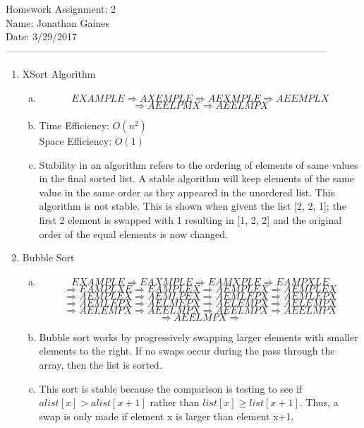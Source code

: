 \documentclass[12pt]{article}
\begin{document}
Homework Assignment: 2\\ 
Name: Jonathan Gaines\\ 
Date: 3/29/2017\\ --------------------------------------------------------------------------------------------------
\begin {enumerate}
\item XSort Algorithm
	\begin {enumerate}[(a)]
		\item
		$$EXAMPLE\Rightarrow 
			AXEMPLE\Rightarrow	
			AEXMPLE\Rightarrow
			AEEMPLX$$ $$\Rightarrow 
		  AEELPMX\Rightarrow
			AEELMPX $$		
		\item
			Time Efficiency: $O(n^{2})$ \\
			Space Efficiency: $O(1)$ 
		\item 
						Stability in an algorithm refers to the ordering of elements of same values in the final sorted list. A stable algorithm will keep elements of the same value in the same order as they appeared in the unordered list. This algorithm is not stable. This is shown when givent the list [2, 2, 1]; the first 2 element is swapped with 1 resulting in [1, 2, 2] and the original order of the equal elements is now changed. \par
	\end {enumerate}
\item Bubble Sort
	\begin {enumerate}[(a)]
		\item
		$$EXAMPLE\Rightarrow
			EAXMPLE\Rightarrow
			EAMXPLE\Rightarrow
			EAMPXLE$$ $$\Rightarrow
			EAMPLXE\Rightarrow
			EAMPLEX\Rightarrow
			AEMPLEX\Rightarrow
			AEMPLEX$$ $$\Rightarrow
			AEMPLEX\Rightarrow
			AEMLPEX\Rightarrow
			AEMLEPX\Rightarrow
			AEMLEPX$$ $$\Rightarrow
			AEMLEPX\Rightarrow
			AELMEPX\Rightarrow
			AELEMPX\Rightarrow
			AELEMPX$$ $$\Rightarrow
			AELEMPX\Rightarrow
			AEELMPX\Rightarrow
			AEELMPX\Rightarrow
			AEELMPX$$ $$\Rightarrow
			AEELMPX\Rightarrow
		$$
		\item
			Bubble sort works by progressively swapping larger elements with smaller elements to the right. If no swaps occur during the pass through the array, then the list is sorted. \par
		\item
			This sort is stable because the comparison is testing to see if $alist[x] > alist[x+1]$ rather than $list[x] \geq list[x+1]$. Thus, a swap is only made if element x is larger than element x+1. \par 

\end{enumerate}
\end{enumerate}
\end{document}
